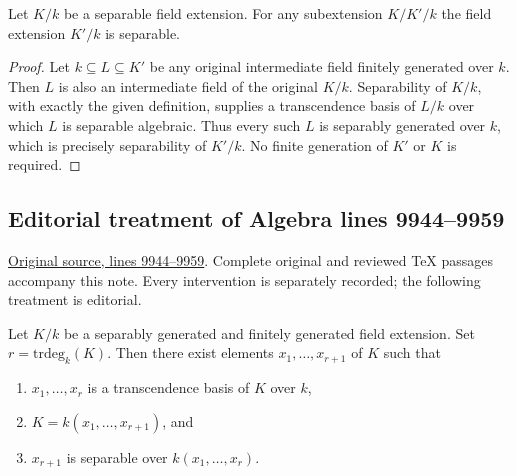 \begin{lemma}
\label{editorial-source-lemma-subextensions-are-separable}
Let $K/k$ be a separable field extension.
For any subextension $K/K'/k$ the field
extension $K'/k$ is separable.
\end{lemma}

\begin{proof}
Let $k\subseteq L\subseteq K'$ be any original
intermediate field finitely generated over $k$.
Then $L$ is also an intermediate field of the
original $K/k$. Separability of $K/k$, with
exactly the given definition, supplies a
transcendence basis of $L/k$ over which $L$
is separable algebraic. Thus every such $L$
is separably generated over $k$, which is
precisely separability of $K'/k$. No finite
generation of $K'$ or $K$ is required.
\end{proof}


\subsection{Editorial treatment of Algebra lines 9944--9959}

\hypertarget{algebra-context-117}{}

\noindent\href{https://github.com/stacks/stacks-project/blob/a04446e57ec1fbc252a871afcec7752fb2807b14/algebra.tex\#L9944}{Original source, lines 9944--9959}. Complete original and reviewed TeX passages accompany this note. Every intervention is separately recorded; the following treatment is editorial.


\begin{lemma}
\label{editorial-source-lemma-generating-finitely-generated-separable-field-extensions}
Let $K/k$ be a separably generated and finitely generated
field extension.
Set $r = \text{trdeg}_k(K)$. Then there exist elements
$x_1, \ldots, x_{r + 1}$ of $K$ such that
\begin{enumerate}
\item $x_1, \ldots, x_r$ is a transcendence basis of $K$ over $k$,
\item $K = k(x_1, \ldots, x_{r + 1})$, and
\item $x_{r + 1}$ is separable over $k(x_1, \ldots, x_r)$.
\end{enumerate}
\end{lemma}

